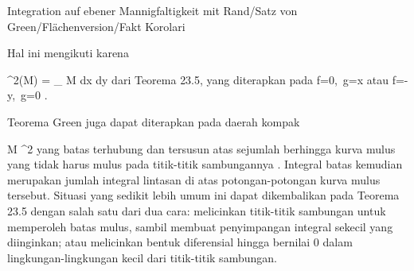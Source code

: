{Integration auf ebener Mannigfaltigkeit mit Rand/Satz von Green/Flächenversion/Fakt}
{Korolari}
{}
{

\faktzusatz {}
\faktzusatz {}

}
{

Hal ini mengikuti karena

\mavergleichskette
{\vergleichskette
{ \lambda^2(M)
}
{ = }{
\int_{ M  }  dx \wedge dy
}
{  }{
}
{    }{
}
{   }{
}
}
{}{}{}
dari
Teorema 23.5,
yang diterapkan pada
\mathkor {} {f=0,\, g=x} {atau} {f=-y,\, g=0} {.}

}

{}
{

Teorema Green juga dapat diterapkan pada daerah kompak

\mavergleichskette
{\vergleichskette
{ M
}
{ \subseteq }{ \R^2
}
{  }{
}
{    }{
}
{   }{
}
}
{}{}{}
yang batas
 {} {}
terhubung dan tersusun atas sejumlah berhingga kurva mulus yang tidak harus mulus pada titik-titik sambungannya
 {} {.}
Integral batas kemudian merupakan jumlah integral lintasan di atas potongan-potongan kurva mulus tersebut. Situasi yang sedikit lebih umum ini dapat dikembalikan pada
Teorema 23.5
dengan salah satu dari dua cara: melicinkan titik-titik sambungan untuk memperoleh batas mulus, sambil membuat penyimpangan integral sekecil yang diinginkan; atau melicinkan bentuk diferensial hingga bernilai $0$ dalam lingkungan-lingkungan kecil dari titik-titik sambungan.

}

